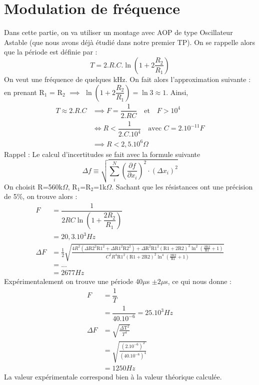 \documentclass[12pt,a4paper]{article}
\begin{document}
\section{Modulation de fréquence}
Dans cette partie, on va utiliser un montage avec AOP de type Oscillateur Astable (que nous avons déjà étudié dans notre premier TP). On se rappelle alors que la période est définie par : 
$$T=2.R.C.\ln(1+2\dfrac{R_2}{R_1})$$
On veut une fréquence de quelques kHz. On fait alors l'approximation suivante : en prenant R$_1$ = R$_2$ $\implies$ $\ln(1+2\dfrac{R_2}{R_1}) = \ln 3 \approx 1$. Ainsi,
\begin{align*}
T\approx 2.R.C &\implies F = \dfrac{1}{2.RC} \quad \text{et} \quad F > 10^4 \\[0.5em]
&\iff R<\dfrac{1}{2.C.10^4} \quad \text{avec } C=2.10^{-11}F\\[1em]
&\implies R<2,5.10^6\Omega
\end{align*}
Rappel : Le calcul d'incertitudes se fait avec la formule suivante
$$\boxed{\Delta f \equiv \sqrt {\sum _{i}^{N}\left( \dfrac {\partial f} {\partial x_{i}}\right) ^{2}\cdot (\Delta x_i)^{2}}}$$
On choisit R=560k$\Omega$, R$_1$=R$_2$=1k$\Omega$. Sachant que les résistances ont une précision de 5\%, on trouve alors : \\
\begingroup
\addtolength{\jot}{0.5em}
\begin{align*}
F&=\dfrac {1} {2RC\ln \left( 1+\dfrac {2R_2} {R_1}\right) }\\
&=20,3.10^{3}Hz\\
\Delta F &= \frac{1}{2} \sqrt{\frac{4 R^2 \left(\text{$\Delta $R2}^2 \text{R1}^2+\text{$\Delta $R1}^2 \text{R2}^2\right)+\text{$\Delta $R}^2 \text{R1}^2 (\text{R1}+2 \text{R2})^2 \ln ^2\left(\frac{2 \text{R2}}{\text{R1}}+1\right)}{C^2 R^4 \text{R1}^2 (\text{R1}+2 \text{R2})^2 \ln ^4\left(\frac{2 \text{R2}}{\text{R1}}+1\right)}}\\
&=...\\
&=2677Hz
\end{align*}
\endgroup
Expérimentalement on trouve une période 40$\mu$s $\pm2\mu$s, ce qui nous donne :
\begin{align*}
F&=\dfrac{1}{T}\\
&=\dfrac{1}{40.10^{-6}}=25.10^3 Hz\\
\Delta F &= \sqrt{\frac{\text{$\Delta $T}^2}{T^4}}\\
&=\sqrt{\frac{\left(2.10^{-6}\right)^2}{\left(40.10^{-6}\right)^4}}\\
&=1250Hz
\end{align*}
La valeur expérimentale correspond bien à la valeur théorique calculée.\\
\end{document}
